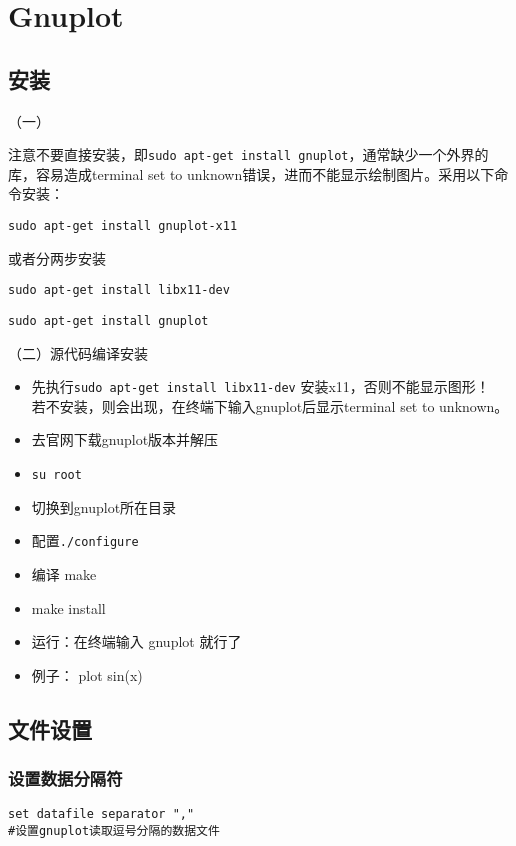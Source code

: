 \section{Gnuplot}
\subsection{安装}
（一）

注意不要直接安装，即\verb*|sudo apt-get install gnuplot|，通常缺少一个外界的库，容易造成terminal set to unknown错误，进而不能显示绘制图片。采用以下命令安装：

\verb*|sudo apt-get install gnuplot-x11|

或者分两步安装

\verb*|sudo apt-get install libx11-dev|

\verb*|sudo apt-get install gnuplot|



（二）源代码编译安装
\begin{itemize}
\item 先执行\verb*|sudo apt-get install libx11-dev|  安装x11，否则不能显示图形！\\
若不安装，则会出现，在终端下输入gnuplot后显示terminal set to unknown。

\item 去官网下载gnuplot版本并解压

\item \verb*|su root|

\item 切换到gnuplot所在目录

\item 配置\verb*|./configure|

\item 编译 make

\item  make install

\item 运行：在终端输入 gnuplot 就行了

\item 例子： plot sin(x)
\end{itemize}



\subsection{文件设置}
\subsubsection{设置数据分隔符}
\begin{verbatim}
set datafile separator ","
#设置gnuplot读取逗号分隔的数据文件
\end{verbatim}

